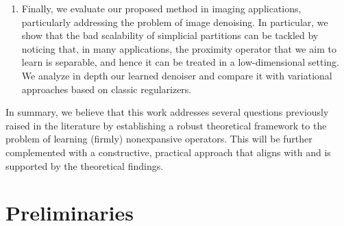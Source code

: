 \documentclass[onefignum,onetabnum]{siamonline250211}
\begin{document}
\begin{itemize}
\begin{enumerate}[label=(\roman*),leftmargin=*]
\item Finally, we evaluate our proposed method in imaging applications, particularly addressing the problem of image denoising. In particular, we show that the bad scalability of simplicial partitions can be tackled by noticing that, in many applications, the proximity operator that we aim to learn is separable, and hence it can be treated in a low-dimensional setting. We analyze in depth our learned denoiser and compare it with variational approaches based on classic regularizers.
\end{enumerate}
\end{itemize}
In summary, we believe that this work addresses several questions previously raised in the literature by establishing a robust theoretical framework to the problem of learning (firmly) nonexpansive operators. This will be further complemented with a constructive, practical approach that aligns with and is supported by the theoretical findings.
\section{Preliminaries}\label{prelimns}
\end{document}
